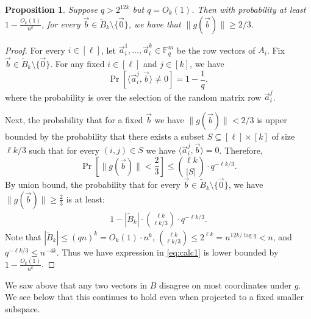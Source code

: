 \documentclass[10pt,a4paper]{article}
\newcommand{\F}{\mathbb{F}}
\renewcommand{\ge}{ \geqslant}
\renewcommand{\le}{ \leqslant}
\newtheorem{proposition}[theorem]{Proposition}
\renewcommand{\tilde}{\widetilde}
\begin{document}
 \begin{proposition}\label{prop:collision}
Suppose $q>2^{12k}$ but $q=O_k(1)$. Then with probability at least $1-\frac{O_k(1)}{n^{k}}$,   for every  $\vec{b}\in \tilde{B}_k\setminus\{\vec{0}\}$, we have that  $\|g(\vec{b})\|\ge 2/3$. 
\end{proposition}  
\begin{proof}
For every $i\in[\ell]$, let $\vec{a}_i^1,\ldots ,\vec{a}_i^k\in\F_q^m$ be the row vectors of  $A_i$.
Fix $\vec{b}\in \tilde{B}_k\setminus\{\vec{0}\}$. 
For any fixed $i\in[\ell]$ and $j\in[k]$, we have $$
\Pr\left[\langle \vec{a}_i^j, \vec{b}\rangle\neq 0\right]=1-\frac{1}{q},
$$
where the probability is over the selection of the random matrix row $\vec{a}_i^j$. 

Next, the probability that for a fixed $\vec{b}$ we have $\|g(\vec{b})\|< 2/3$ is upper bounded by the probability that there exists a subset  $S\subseteq [\ell]\times [k]$ of size    $\ell k/3$ such  that for every $(i,j)\in S$ we have $\langle \vec{a}_i^j, \vec{b}\rangle= 0$. Therefore, 
$$\Pr\left[\|g(\vec{b})\|< \frac{2}{3}\right]\le \binom{\ell k}{|S|}\cdot q^{-\ell k/3}.$$
By union bound, the probability that for every  $\vec{b}\in \tilde{B}_k\setminus\{\vec{0}\}$, we have  $\|g(\vec{b})\|\ge\frac{2}{3}$ is at least:
\begin{align}
 1-|\tilde{B}_k|\cdot\binom{\ell k}{\ell k/3}\cdot q^{-\ell k/3}.\label{eq:calc1}
\end{align}
Note that $|\tilde{B}_k|\le (qn)^k=O_k(1)\cdot n^k$, $\binom{\ell k}{\ell k/3}\le 2^{\ell k}=n^{12k/\log q}< n$, and $q^{-\ell k/3}\le n^{-4k}$. Thus we have expression in \eqref{eq:calc1} is lower bounded by $1-\frac{O_k(1)}{n^{k}}$. 
\end{proof}

We saw above that any two vectors in $B$ disagree on most coordinates under $g$. We see below that this continues to hold even when projected to a fixed smaller subspace. 
   
\end{document}
